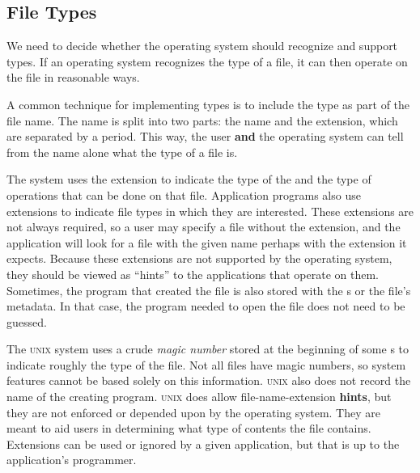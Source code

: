 \subsection{File Types}\label{subsec:File_Types}
We need to decide whether the operating system should recognize and support  types.
If an operating system recognizes the type of a file, it can then operate on the file in reasonable ways.

A common technique for implementing  types is to include the type as part of the file name.
The name is split into two parts: the name and the extension, which are separated by a period.
This way, the user \textbf{and} the operating system can tell from the name alone what the type of a file is.

The system uses the extension to indicate the type of the  and the type of operations that can be done on that file.
Application programs also use extensions to indicate file types in which they are interested.
These extensions are not always required, so a user may specify a file without the extension, and the application will look for a file with the given name perhaps with the extension it expects.
Because these extensions are not supported by the operating system, they should be viewed as ``hints'' to the applications that operate on them.
Sometimes, the program that created the file is also stored with the s or the file's metadata.
In that case, the program needed to open the file does not need to be guessed.

The \textsc{unix} system uses a crude \emph{magic number} stored at the beginning of some s to indicate roughly the type of the file.
Not all files have magic numbers, so system features cannot be based solely on this information.
\textsc{unix} also does not record the name of the creating program.
\textsc{unix} does allow file-name-extension \textbf{hints}, but they are not enforced or depended upon by the operating system.
They are meant to aid users in determining what type of contents the file contains.
Extensions can be used or ignored by a given application, but that is up to the application’s programmer.

